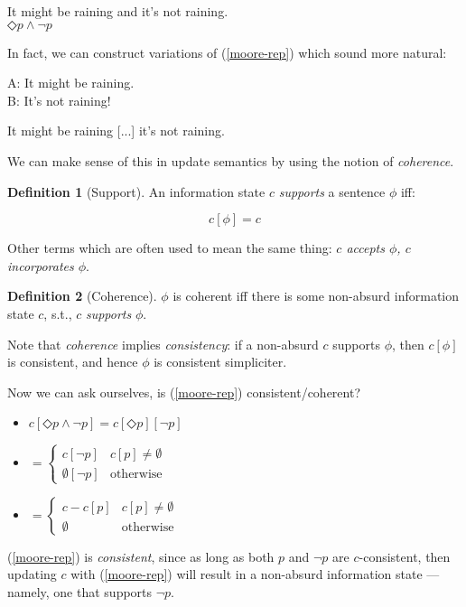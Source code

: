 \documentclass[nols,twoside,nofonts,nobib,nohyper]{tufte-handout}
\theoremstyle{definition}
\newtheorem{definition}{Definition}[section]
\begin{document}
\ex
{}It might be raining and it's not raining.\\
$◇ p ∧ ¬ p$\label{moore-rep}
\xe

In fact, we can construct variations of (\ref{moore-rep}) which sound more natural:

\ex
A: It might be raining.\\
B: It's not raining!
\xe

\ex
It might be raining [...] it's not raining.
\xe

We can make sense of this in update semantics by using the notion of \textit{coherence}.

\begin{definition}[Support]
  An information state $c$ \textit{supports} a sentence $ϕ$ iff:

  $$c[ϕ] = c$$

  Other terms which are often used to mean the same thing: \textit{$c$ accepts $\phi$, $c$ incorporates $\phi$}.
\end{definition}

\begin{definition}[Coherence]
$ϕ$ is coherent iff there is some non-absurd information state $c$, s.t., $c$ \textit{supports} $ϕ$.
\end{definition}

Note that \textit{coherence} implies \textit{consistency}: if a non-absurd $c$ supports $ϕ$, then $c[ϕ]$ is consistent, and hence $ϕ$ is consistent simpliciter.

Now we can ask ourselves, is (\ref{moore-rep}) consistent/coherent?

\begin{itemize}
    \item $c[◇ p ∧ ¬ p] = c[◇ p][¬ p]$
  \item $= \begin{cases}
    c[¬ p]&c[p] ≠ ∅\\
    ∅[¬ p]&\text{otherwise}
   \end{cases}$
  \item $= \begin{cases}
    c - c[p]&c[p] ≠ ∅\\
    ∅&\text{otherwise}
    \end{cases}$
\end{itemize}

(\ref{moore-rep}) is \textit{consistent}, since as long as both $p$ and $¬ p$ are $c$-consistent, then updating $c$ with (\ref{moore-rep}) will result in a non-absurd information state --- namely, one that supports $¬ p$.
\end{document}
